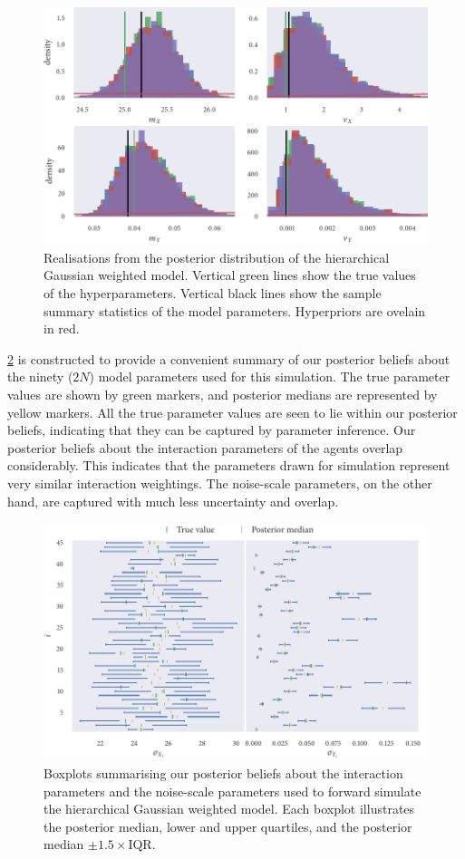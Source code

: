 \begin{figure}[tbp]
  \includegraphics{gauss_hier_hist_hypers.pdf}
  \caption{Realisations from the posterior distribution of the hierarchical Gaussian
    weighted model. Vertical green lines show the true values of the hyperparameters.
    Vertical black lines show the sample summary statistics of the model parameters.
    Hyperpriors are ovelain in red.}
  \label{fig:gauss_hier_hist}
\end{figure}

\cref{fig:gauss_hier_summary} is constructed to provide a convenient summary of our
posterior beliefs about the ninety ($2N$) model parameters used for this simulation. The
true parameter values are shown by green markers, and posterior medians are represented by
yellow markers. All the true parameter values are seen to lie within our posterior
beliefs, indicating that they can be captured by parameter inference. Our posterior
beliefs about the interaction parameters of the agents overlap considerably. This
indicates that the parameters drawn for simulation represent very similar interaction
weightings. The noise-scale parameters, on the other hand, are captured with much less
uncertainty and overlap.

\begin{figure}[tbp]
  \includegraphics{gauss_hier_summary.pdf}
  \caption{Boxplots summarising our posterior beliefs about the interaction parameters and
    the noise-scale parameters used to forward simulate the hierarchical Gaussian weighted
    model. Each boxplot illustrates the posterior median, lower and upper quartiles, and the
    posterior median $\pm1.5\times\text{IQR}$.}
  \label{fig:gauss_hier_summary}
\end{figure}

